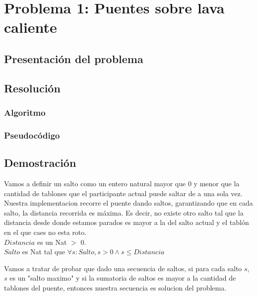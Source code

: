 \section{Problema 1: Puentes sobre lava caliente}

\subsection{Presentaci\'on del problema}

\subsection{Resoluci\'on}
\subsubsection{Algoritmo}

\subsubsection{Pseudoc\'odigo}

\subsection{Demostraci\'on}
Vamos a definir un salto como un entero natural mayor que 0 y menor que la cantidad de tablones que el participante actual puede saltar de a una sola vez.
Nuestra implementacion recorre el puente dando saltos, garantizando que en cada salto, la distancia recorrida es m\'axima. Es decir, no existe otro salto tal que la distancia desde donde estamos parados es mayor a la del salto actual y el tabl\'on en el que caes no esta roto.\\
$Distancia$ es un Nat $>$ 0. \\
$Salto$ es Nat tal que $\forall s:Salto, s > 0 \wedge s \leq Distancia$
 
Vamos a tratar de probar que dado una secuencia de saltos, si para cada salto $s$, $s$ es un "salto maximo" y si la sumatoria de saltos es mayor a la cantidad de tablones del puente, entonces nuestra secuencia es solucion del problema.

